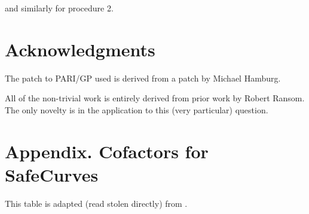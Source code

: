 \documentclass[11pt,fleqn]{article}
\begin{document}
and similarly for procedure 2.

\section{Acknowledgments}

The patch to PARI/GP used is derived from a patch by Michael Hamburg.

All of the non-trivial work is entirely derived from prior work by Robert
Ransom. The only novelty is in the application to this (very particular)
question.

\section*{Appendix. Cofactors for SafeCurves}

This table is adapted (read stolen directly) from \cite{safecurves}.
\end{document}
